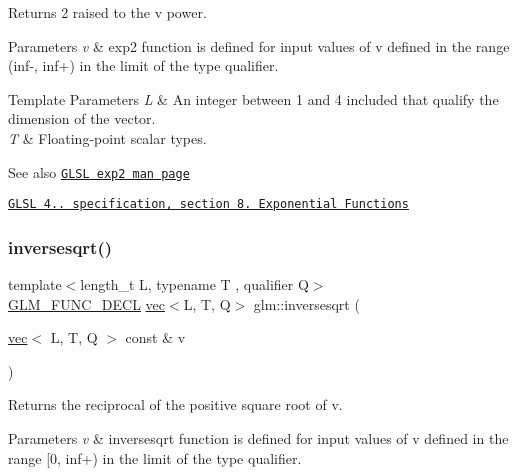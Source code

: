 Returns 2 raised to the v power.


\begin{DoxyParams}{Parameters}
{\em v} & exp2 function is defined for input values of v defined in the range (inf-\/, inf+) in the limit of the type qualifier. \\
\hline
\end{DoxyParams}

\begin{DoxyTemplParams}{Template Parameters}
{\em L} & An integer between 1 and 4 included that qualify the dimension of the vector. \\
\hline
{\em T} & Floating-\/point scalar types.\\
\hline
\end{DoxyTemplParams}
\begin{DoxySeeAlso}{See also}
\href{http://www.opengl.org/sdk/docs/manglsl/xhtml/exp2.xml}{\tt G\+L\+SL exp2 man page} 

\href{http://www.opengl.org/registry/doc/GLSLangSpec.4.20.8.pdf}{\tt G\+L\+SL 4.. specification, section 8. Exponential Functions} 
\end{DoxySeeAlso}
\mbox{\label{group__core__func__exponential_ga523dd6bd0ad9f75ae2d24c8e4b017b7a}} 
\subsubsection{\texorpdfstring{inversesqrt()}{inversesqrt()}}
{\footnotesize\ttfamily template$<$length\+\_\+t L, typename T , qualifier Q$>$ \\
\hyperlink{setup_8hpp_ab2d052de21a70539923e9bcbf6e83a51}{G\+L\+M\+\_\+\+F\+U\+N\+C\+\_\+\+D\+E\+CL} \hyperlink{structglm_1_1vec}{vec}$<$L, T, Q$>$ glm\+::inversesqrt (\begin{DoxyParamCaption}\item[{\hyperlink{structglm_1_1vec}{vec}$<$ L, T, Q $>$ const \&}]{v }\end{DoxyParamCaption})}

Returns the reciprocal of the positive square root of v.


\begin{DoxyParams}{Parameters}
{\em v} & inversesqrt function is defined for input values of v defined in the range \mbox{[}0, inf+) in the limit of the type qualifier. \\
\hline
\end{DoxyParams}

